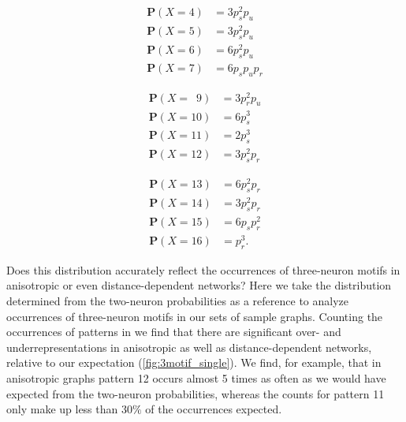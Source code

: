 \begin{minipage}{\linewidth}
  \begin{minipage}[c]{0.32\textwidth}
    \begin{align*}
      \mathbf{P}(X=4) &    =   3 p_s^2 p_u\\
      \mathbf{P}(X=5) &    =   3 p_s^2 p_u\\
      \mathbf{P}(X=6) &    =   6 p_s^2 p_u\\
      \mathbf{P}(X=7) &    =   6 p_s p_u p_r
    \end{align*}
  \end{minipage}%
  \begin{minipage}[c]{0.32\textwidth}
    \begin{align*}
      \mathbf{P}(X=\,\,\,9) &    =   3 p_r^2 p_u\\
      \mathbf{P}(X=10) &   =   6 p_s^3   \\
      \mathbf{P}(X=11) &   =   2 p_s^3    \\
      \mathbf{P}(X=12) &   =   3 p_s^2 p_r
    \end{align*}
  \end{minipage}%
  \begin{minipage}[c]{0.32\textwidth}
    \begin{align*}
      \mathbf{P}(X=13) &   =   6 p_s^2 p_r\\
      \mathbf{P}(X=14) &   =   3 p_s^2 p_r\\
      \mathbf{P}(X=15) &   =   6 p_s p_r^2\\
      \mathbf{P}(X=16) &   =   p_r^3.
    \end{align*}
  \end{minipage}  
\end{minipage}


Does this distribution accurately reflect the occurrences of
three-neuron motifs in anisotropic or even distance-dependent
networks? Here we take the distribution  determined from the two-neuron
probabilities as a reference to analyze occurrences of three-neuron
motifs in our sets of sample graphs. Counting the occurrences of
patterns in we find that there are significant over- and
underrepresentations in anisotropic as well as distance-dependent
networks, relative to our expectation
(\autoref{fig:3motif_single}). We find, for example, that in
anisotropic graphs pattern 12 occurs almost 5 times as often as we
would have expected from the two-neuron probabilities, whereas
the counts for pattern 11 only make up less than $30\%$ of the
occurrences expected.  

